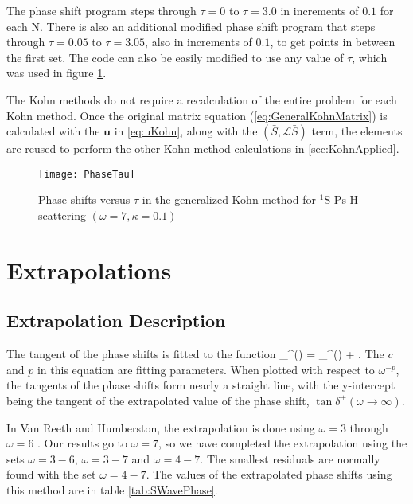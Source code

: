 \documentclass[Dissertation.tex]{subfiles}
\begin{document}
The phase shift program steps through $\tau = 0$ to $\tau = 3.0$ in increments of $0.1$ for each N. There is also an additional modified phase shift program that steps through $\tau = 0.05$ to $\tau = 3.05$, also in increments of $0.1$, to get points in between the first set. The code can also be easily modified to use any value of $\tau$, which was used in figure \ref{fig:PhaseTau}.

The Kohn methods do not require a recalculation of the entire problem for each Kohn method. Once the original matrix equation (\cref{eq:GeneralKohnMatrix}) is calculated with the $\textbf{u}$ in \cref{eq:uKohn}, along with the $(\bar{S},\mathcal{L} \bar{S})$ term, the elements are reused to perform the other Kohn method calculations in \cref{sec:KohnApplied}.



\setlength{\abovecaptionskip}{0pt}   %

\begin{figure}[H]
	\centering
	\texttt{[image: PhaseTau]}
	\caption[Phase shifts versus $\tau$ in the generalized Kohn method]{Phase shifts versus $\tau$ in the generalized Kohn method for $^1$S Ps-H scattering $(\omega = 7, \kappa = 0.1)$}
	\label{fig:PhaseTau}
\end{figure}




\section{Extrapolations}
\label{sec:Extrapolations}

\subsection{Extrapolation Description}


The tangent of the phase shifts is fitted to the function
\beq
\label{eq:PhaseExtrap}
\tan \delta_\ell^\pm(\omega) = \tan \delta_\ell^\pm(\omega \to \infty) + .
\eeq
The $c$ and $p$ in this equation are fitting parameters. When plotted with respect to $\omega^{-p}$, the tangents of the phase shifts form nearly a straight line, with the y-intercept being the tangent of the extrapolated value of the phase shift, $\tan \delta^\pm(\omega \to \infty)$.

In Van Reeth and Humberston, the extrapolation is done using $\omega = 3$ through $\omega = 6$ \cite{VanReeth2003}. Our results go to $\omega = 7$, so we have completed the extrapolation using the sets $\omega = 3-6$, $\omega = 3-7$ and $\omega = 4-7$. The smallest residuals are normally found with the set $\omega = 4-7$. The values of the extrapolated phase shifts using this method are in table \ref{tab:SWavePhase}.
\end{document}
